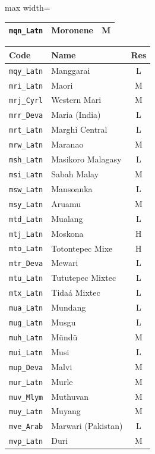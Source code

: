 {\begin{adjustbox}{max width=\textwidth}
\begin{tabular}{llc}
        \texttt{mqn\_Latn} & Moronene & M \\
        \bottomrule
    \end{tabular}
    \quad
    \begin{tabular}{llc}
        \toprule
        \textbf{Code} & \textbf{Name} & \textbf{Res}\\
        \midrule
        \texttt{mqy\_Latn} & Manggarai & L \\
        \texttt{mri\_Latn} & Maori & M \\
        \texttt{mrj\_Cyrl} & Western Mari & M \\
        \texttt{mrr\_Deva} & Maria (India) & L \\
        \texttt{mrt\_Latn} & Marghi Central & L \\
        \texttt{mrw\_Latn} & Maranao & M \\
        \texttt{msh\_Latn} & Masikoro Malagasy & L \\
        \texttt{msi\_Latn} & Sabah Malay & M \\
        \texttt{msw\_Latn} & Mansoanka & L \\
        \texttt{msy\_Latn} & Aruamu & M \\
        \texttt{mtd\_Latn} & Mualang & L \\
        \texttt{mtj\_Latn} & Moskona & H \\
        \texttt{mto\_Latn} & Totontepec Mixe & H \\
        \texttt{mtr\_Deva} & Mewari & L \\
        \texttt{mtu\_Latn} & Tututepec Mixtec & L \\
        \texttt{mtx\_Latn} & Tidaá Mixtec & L \\
        \texttt{mua\_Latn} & Mundang & L \\
        \texttt{mug\_Latn} & Musgu & L \\
        \texttt{muh\_Latn} & Mündü & M \\
        \texttt{mui\_Latn} & Musi & L \\
        \texttt{mup\_Deva} & Malvi & M \\
        \texttt{mur\_Latn} & Murle & M \\
        \texttt{muv\_Mlym} & Muthuvan & M \\
        \texttt{muy\_Latn} & Muyang & M \\
        \texttt{mve\_Arab} & Marwari (Pakistan) & L \\
        \texttt{mvp\_Latn} & Duri & M \\

\end{tabular}
\end{adjustbox}}

